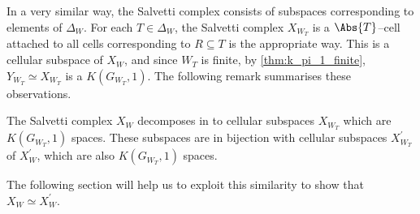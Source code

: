 \documentclass[class=article, crop=false]{standalone}
\begin{document}
In a very similar way, the Salvetti complex consists of subspaces corresponding to elements of $\Delta_W$. For each $T \in \Delta_W$, the Salvetti complex $X_{W_T}$ is a $\Abs{T}$--cell attached to all cells corresponding to $R \subseteq T$ is the appropriate way. This is a cellular subspace of $X_W$, and since $W_T$ is finite, by \cref{thm:k_pi_1_finite}, $Y_{W_T} \simeq X_{W_T}$ is a $K(G_{W_T},1)$. The following remark summarises these observations.

\begin{remark}
    The Salvetti complex $X_W$ decomposes in to cellular subspaces $X_{W_T}$ which are $K(G_{W_T},1)$ spaces. These subspaces are in bijection with cellular subspaces $X^\prime_{W_T}$ of $X^\prime_W$, which are also $K(G_{W_T},1)$ spaces.
    \label{rmk:salvetti_X_prime_similarities}
\end{remark}

 The following section will help us to exploit this similarity to show that $X_W \simeq X^\prime_{W}$.
\end{document}
